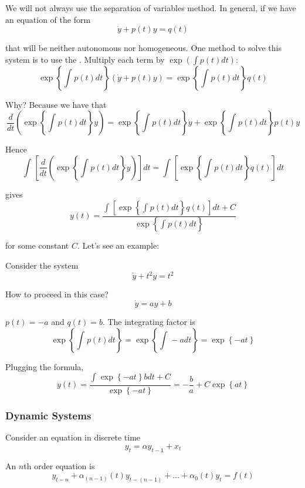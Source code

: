 \documentclass{article}
\begin{document}
We will not always use the separation of variables method. In general, if we have an equation of the form
\[
  \dot{y} + p(t) y = q(t)
\]

that will be neither autonomous nor homogeneous. One method to solve this system is to use the . Multiply each term by $\exp(\int p(t) dt)$:
\[
  \exp\left\{\int_{}^{} p(t) dt\right\}
  \left(\dot{y} + p(t) y\right)
  =
  \exp\left\{\int_{}^{} p(t) dt\right\}
  q(t)
\]

Why? Because we have that
\[
  \dfrac{d}{dt}
  \left(
    \exp\left\{\int_{}^{} p(t) dt\right\}
    y
  \right)
  =
  \exp\left\{\int_{}^{} p(t) dt\right\} \dot{y}
  +
  \exp\left\{\int_{}^{} p(t) dt\right\} p(t) y
\]

Hence
\[
  \int_{}^{}
  \left[
    \dfrac{d}{dt}
    \left(
      \exp\left\{\int_{}^{} p(t) dt\right\}
      y
    \right)
  \right]
  dt
  =
  \int_{}^{}
  \left[
    \exp\left\{\int_{}^{} p(t) dt\right\}
    q(t)
  \right]
  dt
\]

gives
\[
  y(t)
  =
  \dfrac{
    \int_{}^{}
    \left[
      \exp\left\{\int_{}^{} p(t) dt\right\}
      q(t)
    \right]
    dt
    +
    C
  }{
    \exp\left\{\int_{}^{} p(t) dt\right\}
  }
\]

for some constant $C$. Let's see an example:

\begin{example}
  Consider the system
  \[
    \dot{y} + t^2 y = t^2
  \]

  How to proceed in this case?
  \[
    \dot{y} = ay + b
  \]

  $p(t) = -a$ and $q(t) = b$. The integrating factor is
  \[
    \exp\left\{\int_{}^{} p(t) dt\right\}
    =
    \exp\left\{\int_{}^{} -a dt\right\}
    =
    \exp\left\{-at\right\}
  \]

  Plugging the formula,
  \[
    y(t) =
    \dfrac{
      \int_{}^{}
      \exp\left\{-at\right\} b dt
      + C
    }{
      \exp\left\{-at\right\}
    }
    =
    - \dfrac{b}{a}
    + C \exp\left\{at\right\}
  \]
\end{example}

\subsubsection{Dynamic Systems}
\label{ssub:dynamic_systems}

Consider an equation in discrete time
\[
  y_t = \alpha y_{t - 1} + x_t
\]

An $n$th order  equation is
\[
  y_{t - n}
  + \alpha_{(n - 1)}(t) y_{t - (n - 1)}
  + \ldots
  + \alpha_{0}(t) y_{t}
  =
  f(t)
\]
\end{document}
